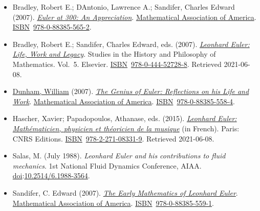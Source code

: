 \begin{itemize}
\tightlist
\item
  Bradley, Robert E.; D\textquotesingle Antonio, Lawrence A.; Sandifer, Charles Edward (2007). \href{https://books.google.com/books?id=tK_KRmTf9nUC}{\emph{Euler at 300: An Appreciation}}. \href{https://en.wikipedia.org/wiki/Mathematical_Association_of_America}{Mathematical Association of America}. \href{https://en.wikipedia.org/wiki/ISBN_(identifier)}{ISBN}{~}\href{https://en.wikipedia.org/wiki/Special:BookSources/978-0-88385-565-2}{978-0-88385-565-2}.{}
\item
  Bradley, Robert E.; Sandifer, Charles Edward, eds. (2007). \href{https://books.google.com/books?id=75vJL_Y-PvsC}{\emph{Leonhard Euler: Life, Work and Legacy}}. Studies in the History and Philosophy of Mathematics. Vol.{~}5. Elsevier. \href{https://en.wikipedia.org/wiki/ISBN_(identifier)}{ISBN}{~}\href{https://en.wikipedia.org/wiki/Special:BookSources/978-0-444-52728-8}{978-0-444-52728-8}{. Retrieved {2021-06-08}}.{}
\item
  \href{https://en.wikipedia.org/wiki/William_Dunham_(mathematician)}{Dunham, William} (2007). \href{https://books.google.com/books?id=A6by_UpQikIC}{\emph{The Genius of Euler: Reflections on his Life and Work}}. \href{https://en.wikipedia.org/wiki/Mathematical_Association_of_America}{Mathematical Association of America}. \href{https://en.wikipedia.org/wiki/ISBN_(identifier)}{ISBN}{~}\href{https://en.wikipedia.org/wiki/Special:BookSources/978-0-88385-558-4}{978-0-88385-558-4}.{}
\item
  Hascher, Xavier; Papadopoulos, Athanase, eds. (2015). \href{https://books.google.com/books?id=KVcGrgEACAAJ}{\emph{Leonhard Euler: Mathématicien, physicien et théoricien de la musique}} (in French). Paris: CNRS Editions. \href{https://en.wikipedia.org/wiki/ISBN_(identifier)}{ISBN}{~}\href{https://en.wikipedia.org/wiki/Special:BookSources/978-2-271-08331-9}{978-2-271-08331-9}{. Retrieved {2021-06-08}}.{}
\item
  Salas, M. (July 1988). \emph{Leonhard Euler and his contributions to fluid mechanics}. 1st National Fluid Dynamics Conference, AIAA. \href{https://en.wikipedia.org/wiki/Doi_(identifier)}{doi}:\href{https://doi.org/10.2514\%2F6.1988-3564}{10.2514/6.1988-3564}.{}
\item
  Sandifer, C. Edward (2007). \href{https://books.google.com/books?id=CvBxLr_0uBQC}{\emph{The Early Mathematics of Leonhard Euler}}. \href{https://en.wikipedia.org/wiki/Mathematical_Association_of_America}{Mathematical Association of America}. \href{https://en.wikipedia.org/wiki/ISBN_(identifier)}{ISBN}{~}\href{https://en.wikipedia.org/wiki/Special:BookSources/978-0-88385-559-1}{978-0-88385-559-1}.{}

\end{itemize}
